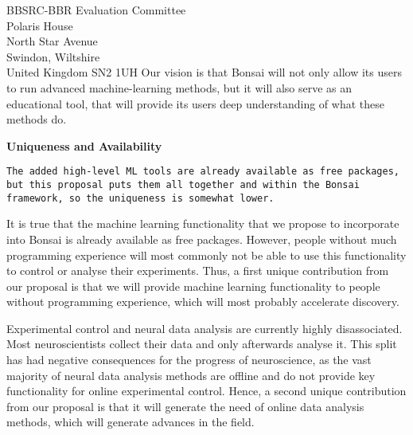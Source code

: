 \documentclass[12pt]{letter}
\begin{document}
\begin{letter}{
    BBSRC-BBR Evaluation Committee\\
    Polaris House\\
    North Star Avenue\\
    Swindon, Wiltshire\\
    United Kingdom SN2 1UH
}
Our vision is that Bonsai will not only allow its users to run advanced
machine-learning methods, but it will also serve as an educational tool, that
will provide its users deep understanding of what these methods do.

\noindent\textbf{Uniqueness and Availability}

    \texttt{The added high-level ML tools are already available as free
    packages, but this proposal puts them all together and within the Bonsai
    framework, so the uniqueness is somewhat lower.}

It is true that the machine learning functionality that we propose to
incorporate into Bonsai is already available as free packages. However, people
without much programming experience will most commonly not be able to use this
functionality to control or analyse their experiments. Thus, a first unique
contribution from our proposal is that we will provide machine learning
functionality to people without programming experience, which will most
probably accelerate discovery.

Experimental control and neural data analysis are currently highly
disassociated. Most neuroscientists collect their data and only afterwards
analyse it. This split has had negative consequences for the progress of
neuroscience, as the vast majority of neural data analysis methods are offline
and do not provide key functionality for online experimental control. Hence, a
second unique contribution from our proposal is that it will generate the need
of online data analysis methods, which will generate advances in the field.

\end{letter}
\end{document}

